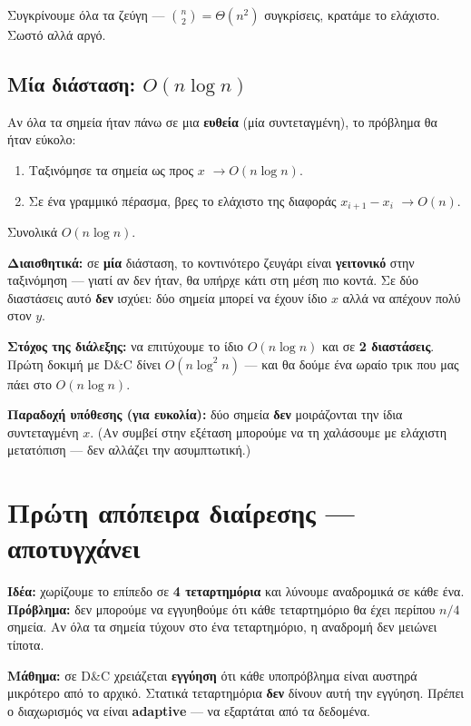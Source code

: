 \documentclass[11pt,a4paper]{article}
\begin{document}
Συγκρίνουμε όλα τα ζεύγη --- $\binom{n}{2} = \Theta(n^2)$ συγκρίσεις, κρατάμε το
ελάχιστο. Σωστό αλλά αργό.

\subsection{Μία διάσταση: $O(n \log n)$}

Αν όλα τα σημεία ήταν πάνω σε μια \textbf{ευθεία} (μία συντεταγμένη), το πρόβλημα
θα ήταν εύκολο:
\begin{enumerate}
  \item Ταξινόμησε τα σημεία ως προς $x$ $\to O(n \log n)$.
  \item Σε ένα γραμμικό πέρασμα, βρες το ελάχιστο της διαφοράς $x_{i+1} - x_i$
  $\to O(n)$.
\end{enumerate}
Συνολικά $O(n \log n)$.

\textbf{Διαισθητικά:} σε \textbf{μία} διάσταση, το κοντινότερο ζευγάρι είναι
\textbf{γειτονικό} στην ταξινόμηση --- γιατί αν δεν ήταν, θα υπήρχε κάτι στη μέση
πιο κοντά. Σε δύο διαστάσεις αυτό \textbf{δεν} ισχύει: δύο σημεία μπορεί να έχουν
ίδιο $x$ αλλά να απέχουν πολύ στον $y$.

\begin{keypoint}
\textbf{Στόχος της διάλεξης:} να επιτύχουμε το ίδιο $O(n \log n)$ και σε
\textbf{2 διαστάσεις}. Πρώτη δοκιμή με D\&C δίνει $O(n \log^2 n)$ --- και θα δούμε
ένα ωραίο τρικ που μας πάει στο $O(n \log n)$.
\end{keypoint}

\textbf{Παραδοχή υπόθεσης (για ευκολία):} δύο σημεία \textbf{δεν} μοιράζονται την
ίδια συντεταγμένη $x$. (Αν συμβεί στην εξέταση μπορούμε να τη χαλάσουμε με
ελάχιστη μετατόπιση --- δεν αλλάζει την ασυμπτωτική.)

\section{Πρώτη απόπειρα διαίρεσης --- αποτυγχάνει}

\textbf{Ιδέα:} χωρίζουμε το επίπεδο σε \textbf{4 τεταρτημόρια} και λύνουμε
αναδρομικά σε κάθε ένα. \textbf{Πρόβλημα:} δεν μπορούμε να εγγυηθούμε ότι κάθε
τεταρτημόριο θα έχει περίπου $n/4$ σημεία. Αν όλα τα σημεία τύχουν στο ένα
τεταρτημόριο, η αναδρομή δεν μειώνει τίποτα.

\begin{warningbox}
\textbf{Μάθημα:} σε D\&C χρειάζεται \textbf{εγγύηση} ότι κάθε υποπρόβλημα είναι
αυστηρά μικρότερο από το αρχικό. Στατικά τεταρτημόρια \textbf{δεν} δίνουν αυτή
την εγγύηση. Πρέπει ο διαχωρισμός να είναι \textbf{adaptive} --- να εξαρτάται από
τα δεδομένα.
\end{warningbox}
\end{document}
